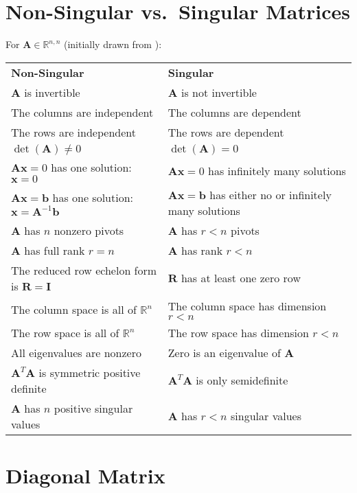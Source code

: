 \documentclass{book}
\newcommand{\mA}{\mathbf{A}}
\newcommand{\mI}{\mathbf{I}}
\newcommand{\mR}{\mathbf{R}}
\newcommand{\vb}{\mathbf{b}}
\newcommand{\vx}{\mathbf{x}}
\newcommand{\sRn}{\mathbb{R}^{n}}
\newcommand{\sRnn}{\mathbb{R}^{n,n}}
\begin{document}
\section{Non-Singular vs.\ Singular Matrices}
For $\mA\in\sRnn$ (initially drawn from \citep[p.\ 574]{Strang2016}):
\begin{center}
\begin{tabular}{ll}
\textbf{Non-Singular}                           & \textbf{Singular}                        \\
$\mA$ is invertible                             & $\mA$ is not invertible                  \\
The columns are independent                     & The columns are dependent                \\
The rows are independent                        & The rows are dependent                   \\
$\det(\mA)\ne0$                                 & $\det(\mA)=0$                            \\
$\mA\vx=0$ has one solution: $\vx=0$            & $\mA\vx=0$ has infinitely many solutions \\
$\mA\vx=\vb$ has one solution: $\vx=\mA^{-1}\vb$& $\mA\vx=\vb$ has either no or infinitely many solutions \\
$\mA$ has $n$ nonzero pivots                    & $\mA$ has $r<n$ pivots                   \\
$\mA$ has full rank $r=n$                       & $\mA$ has rank $r<n$                     \\
The reduced row echelon form is $\mR=\mI$       & $\mR$ has at least one zero row          \\
The column space is all of $\sRn$               & The column space has dimension $r<n$     \\
The row space is all of $\sRn$                  & The row space has dimension $r<n$        \\
All eigenvalues are nonzero                     & Zero is an eigenvalue of $\mA$           \\
$\mA^T\mA$ is symmetric positive definite       & $\mA^T\mA$ is only semidefinite          \\
$\mA$ has $n$ positive singular values          & $\mA$ has $r<n$ singular values        
\end{tabular}
\end{center}

\section{Diagonal Matrix}
\end{document}
